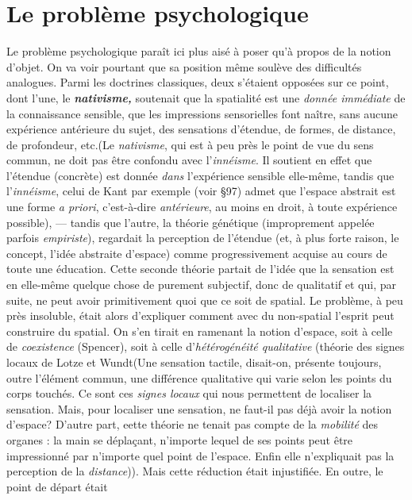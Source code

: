 \section{Le problème psychologique}%
Le problème psychologique
paraît ici plus aisé à poser qu’à propos de la notion d'objet. On va
voir pourtant que sa position même soulève des difficultés analogues.
Parmi les doctrines classiques, deux s'étaient opposées sur ce point,
dont l’une, le \textbf{\textit {nativisme,}} soutenait que la spatialité est une {\it donnée
immédiate} de la connaissance sensible, que les impressions sensorielles
font naître, sans aucune expérience antérieure du sujet, des sensations
d’étendue, de formes, de distance, de profondeur, etc.{\scriptsize (Le
{\it nativisme}, qui est à peu près le point de vue du sens commun, ne doit pas
être confondu avec l'{\it innéisme}. Il soutient en effet que l'étendue (concrète)
est donnée {\it dans} l'expérience sensible elle-même, tandis que l’{\it innéisme},
celui de Kant par exemple (voir \S 97) admet que l’espace abstrait est une
forme {\it a priori}, c'est-à-dire {\it antérieure}, au moins en droit, à toute expérience
possible)}, —
tandis que l’autre, la théorie génétique (improprement appelée parfois
{\it empiriste}), regardait la perception de l’étendue (et, à plus forte
raison, le concept, l’idée abstraite d’espace) comme progressivement
acquise au cours de toute une éducation. Cette seconde théorie partait
de l’idée que la sensation est en elle-même quelque chose de
purement subjectif, donc de qualitatif et qui, par suite, ne peut
avoir primitivement quoi que ce soit de spatial. Le problème, à peu
près insoluble, était alors d'expliquer comment avec du non-spatial
l'esprit peut construire du spatial. On s’en tirait en ramenant la notion
d’espace, soit à celle de {\it coexistence} (Spencer), soit à celle d’{\it hétérogénéité
qualitative} (théorie des signes locaux de Lotze et Wundt{\scriptsize (Une
sensation tactile, disait-on, présente toujours, outre l'élément commun, une
différence qualitative qui varie selon les points du corps touchés. Ce sont ces
{\it signes locaux} qui nous permettent de localiser la sensation. Mais, pour
localiser une sensation, ne faut-il pas déjà avoir la notion d'espace? D'autre
part, eette théorie ne tenait pas compte de la {\it mobilité} des organes : la main
se déplaçant, n'importe lequel de ses points peut être impressionné par
n'importe quel point de l’espace. Enfin elle n'expliquait pas
la perception de la {\it distance})}).
Mais cette réduction était injustifiée. En outre, le point de départ était
